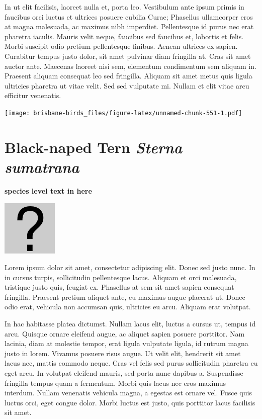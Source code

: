 \documentclass[]{book}
\let\origfigure\figure
\let\endorigfigure\endfigure
\renewenvironment{figure}[1][2] {
  \expandafter\origfigure\expandafter[H]
} {
  \endorigfigure
}
\begin{document}
In ut elit facilisis, laoreet nulla et, porta leo. Vestibulum ante ipsum
primis in faucibus orci luctus et ultrices posuere cubilia Curae;
Phasellus ullamcorper eros at magna malesuada, ac maximus nibh
imperdiet. Pellentesque id purus nec erat pharetra iaculis. Mauris velit
neque, faucibus sed faucibus et, lobortis et felis. Morbi suscipit odio
pretium pellentesque finibus. Aenean ultrices ex sapien. Curabitur
tempus justo dolor, sit amet pulvinar diam fringilla at. Cras sit amet
auctor ante. Maecenas laoreet nisi sem, elementum condimentum sem
aliquam in. Praesent aliquam consequat leo sed fringilla. Aliquam sit
amet metus quis ligula ultricies pharetra ut vitae velit. Sed sed
vulputate mi. Nullam et elit vitae arcu efficitur venenatis.

\begin{figure}
\centering
\texttt{[image: brisbane-birds\_files/figure-latex/unnamed-chunk-551-1.pdf]}
\caption{\label{fig:unnamed-chunk-551}insert figure caption}
\end{figure}

\section{\texorpdfstring{Black-naped Tern \emph{Sterna
sumatrana}}{Black-naped Tern Sterna sumatrana}}\label{black-naped-tern-sterna-sumatrana}

\textbf{species level text in here}

\begin{figure}
\centering
\includegraphics{assets/missing.png}
\caption{No image for species}
\end{figure}

Lorem ipsum dolor sit amet, consectetur adipiscing elit. Donec sed justo
nunc. In in cursus turpis, sollicitudin pellentesque lacus. Aliquam et
orci malesuada, tristique justo quis, feugiat ex. Phasellus at sem sit
amet sapien consequat fringilla. Praesent pretium aliquet ante, eu
maximus augue placerat ut. Donec odio erat, vehicula non accumsan quis,
ultricies eu arcu. Aliquam erat volutpat.

In hac habitasse platea dictumst. Nullam lacus elit, luctus a cursus ut,
tempus id arcu. Quisque ornare eleifend augue, ac aliquet sapien posuere
porttitor. Nam lacinia, diam at molestie tempor, erat ligula vulputate
ligula, id rutrum magna justo in lorem. Vivamus posuere risus augue. Ut
velit elit, hendrerit sit amet lacus nec, mattis commodo neque. Cras vel
felis sed purus sollicitudin pharetra eu eget arcu. In volutpat eleifend
mauris, sed porta nunc dapibus a. Suspendisse fringilla tempus quam a
fermentum. Morbi quis lacus nec eros maximus interdum. Nullam venenatis
vehicula magna, a egestas est ornare vel. Fusce quis luctus orci, eget
congue dolor. Morbi luctus est justo, quis porttitor lacus facilisis sit
amet.
\end{document}
